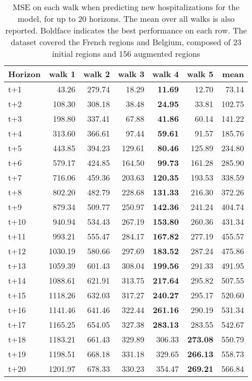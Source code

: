 \begin{table}[H]
\centering
\caption{MSE on each walk when predicting new hospitalizations for the model, for up to 20 horizons. The mean over all walks is also reported. Boldface indicates the best performance on each row. The dataset covered the French regions and Belgium, composed of 23 initial regions and 156 augmented regions }
\label{tab:MSE_walk_baseline}
\begin{tabular}{lrrrrrr}
\toprule
Horizon &  walk 1 &  walk 2 &  walk 3 &  walk 4 &  walk 5 &   mean \\
\midrule
t+1  & 43.26  & 279.74  & 18.29  & \textbf{11.69}  & 12.70  & 73.14  \\
t+2  & 108.30  & 308.18  & 38.48  & \textbf{24.95}  & 33.81  & 102.75  \\
t+3  & 198.80  & 337.41  & 67.88  & \textbf{41.86}  & 60.14  & 141.22  \\
t+4  & 313.60  & 366.61  & 97.44  & \textbf{59.61}  & 91.57  & 185.76  \\
t+5  & 443.85  & 394.23  & 129.61  & \textbf{80.46}  & 125.89  & 234.80  \\
t+6  & 579.17  & 424.85  & 164.50  & \textbf{99.73}  & 161.28  & 285.90  \\
t+7  & 716.06  & 459.36  & 203.63  & \textbf{120.35}  & 193.53  & 338.59  \\
t+8  & 802.20  & 482.79  & 228.68  & \textbf{131.33}  & 216.30  & 372.26  \\
t+9  & 879.34  & 509.77  & 250.97  & \textbf{142.36}  & 241.24  & 404.74  \\
t+10  & 940.94  & 534.43  & 267.19  & \textbf{153.80}  & 260.36  & 431.34  \\
t+11  & 993.21  & 555.47  & 284.17  & \textbf{167.82}  & 277.19  & 455.57  \\
t+12  & 1030.19  & 580.66  & 297.69  & \textbf{183.52}  & 287.24  & 475.86  \\
t+13  & 1059.39  & 601.43  & 308.04  & \textbf{199.56}  & 291.33  & 491.95  \\
t+14  & 1088.61  & 621.91  & 313.75  & \textbf{217.64}  & 295.82  & 507.55  \\
t+15  & 1118.26  & 632.03  & 317.27  & \textbf{240.27}  & 295.17  & 520.60  \\
t+16  & 1141.46  & 641.46  & 322.44  & \textbf{261.16}  & 290.19  & 531.34  \\
t+17  & 1165.25  & 654.05  & 327.38  & \textbf{283.13}  & 283.55  & 542.67  \\
t+18  & 1183.21  & 661.43  & 329.89  & 306.33  & \textbf{273.08}  & 550.79  \\
t+19  & 1198.51  & 668.18  & 331.18  & 329.65  & \textbf{266.13}  & 558.73  \\
t+20  & 1201.97  & 678.33  & 330.23  & 354.47  & \textbf{269.21}  & 566.84  \\

\bottomrule
\end{tabular}
\end{table}

